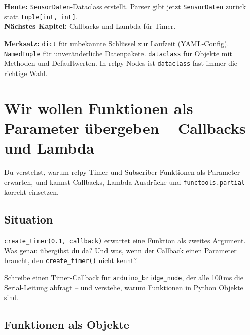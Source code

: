 \begin{projektBox}
\textbf{Heute:} \texttt{SensorDaten}-Dataclass erstellt.
Parser gibt jetzt \texttt{SensorDaten} zurück statt \texttt{tuple[int, int]}.\\
\textbf{Nächstes Kapitel:} Callbacks und Lambda für Timer.
\end{projektBox}

\begin{merksatzBox}
\textbf{Merksatz:}
\texttt{dict} für unbekannte Schlüssel zur Laufzeit (YAML-Config).
\texttt{NamedTuple} für unveränderliche Datenpakete.
\texttt{dataclass} für Objekte mit Methoden und Defaultwerten.
In rclpy-Nodes ist \texttt{dataclass} fast immer die richtige Wahl.
\end{merksatzBox}


\chapter{Wir wollen Funktionen als Parameter übergeben –
  Callbacks und Lambda}

\begin{lernziele}
Du verstehst, warum rclpy-Timer und Subscriber Funktionen
als Parameter erwarten, und kannst Callbacks,
Lambda-Ausdrücke und \texttt{functools.partial} korrekt einsetzen.
\end{lernziele}

\section{Situation}

\texttt{create\_timer(0.1, callback)} erwartet eine Funktion als zweites Argument.
Was genau übergibst du da?
Und was, wenn der Callback einen Parameter braucht,
den \texttt{create\_timer()} nicht kennt?

\begin{aufgabeBox}
Schreibe einen Timer-Callback für \texttt{arduino\_bridge\_node},
der alle 100\,ms die Serial-Leitung abfragt --
und verstehe, warum Funktionen in Python Objekte sind.
\end{aufgabeBox}

\section{Funktionen als Objekte}

